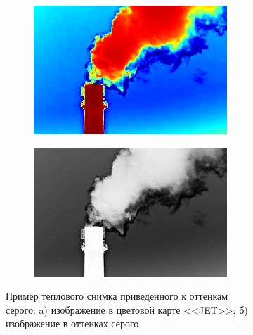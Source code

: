\documentclass[14pt, a4paper]{extreport}
\begin{document}
	\begin{figure}[h!]
		\begin{subfigure}{.45\textwidth}
			\centering
			\includegraphics[width = \textwidth]{image/chapter_2/abstrtact_JET_example}
			\caption{}
		\end{subfigure}
		\begin{subfigure}{.45\textwidth}
			\centering
			\includegraphics[width = \textwidth]{image/chapter_2/abstrtact_gray_example}
			\caption{}
		\end{subfigure}
		\centering
		\caption{Пример теплового снимка приведенного к оттенкам \\серого: a) изображение в цветовой карте <<JET>>; б) изображение в оттенках серого}
		\label{fig:gray_tep_example}
	\end{figure}
\end{document}
